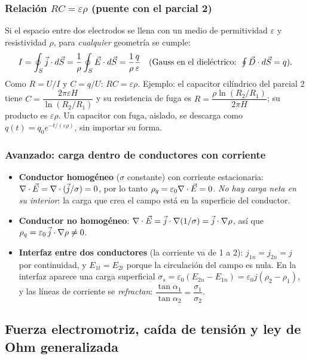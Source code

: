 \documentclass[11pt]{article}
\begin{document}
\subsubsection*{Relación $RC=\varepsilon\rho$ (puente con el parcial 2)}
Si el espacio entre dos electrodos se llena con un medio de permitividad $\varepsilon$ y resistividad $\rho$, para \emph{cualquier} geometría se cumple:
\[
I=\oint_S\vec{j}\cdot d\vec S=\frac1\rho\oint_S\vec{E}\cdot d\vec S=\frac{1}{\rho}\frac{q}{\varepsilon}\quad\text{(Gauss en el dieléctrico: }\textstyle\oint\vec{D}\cdot d\vec S=q).
\]
Como $R=U/I$ y $C=q/U$: $\boxed{RC=\varepsilon\rho}$. Ejemplo: el capacitor cilíndrico del parcial 2 tiene $C=\dfrac{2\pi\varepsilon H}{\ln(R_2/R_1)}$ y su resistencia de fuga es $R=\dfrac{\rho\ln(R_2/R_1)}{2\pi H}$; su producto es $\varepsilon\rho$. Un capacitor con fuga, aislado, se descarga como $q(t)=q_0e^{-t/(\varepsilon\rho)}$, sin importar su forma.

\subsubsection*{Avanzado: carga dentro de conductores con corriente}
\begin{itemize}
\item \textbf{Conductor homogéneo} ($\sigma$ constante) con corriente estacionaria: $\nabla\cdot\vec{E}=\nabla\cdot(\vec{j}/\sigma)=0$, por lo tanto $\rho_q=\varepsilon_0\nabla\cdot\vec{E}=0$. \emph{No hay carga neta en su interior}: la carga que crea el campo está en la superficie del conductor.
\item \textbf{Conductor no homogéneo}: $\nabla\cdot\vec{E}=\vec{j}\cdot\nabla(1/\sigma)=\vec{j}\cdot\nabla\rho$, así que $\rho_q=\varepsilon_0\,\vec{j}\cdot\nabla\rho\neq0$.
\item \textbf{Interfaz entre dos conductores} (la corriente va de 1 a 2): $j_{1n}=j_{2n}=j$ por continuidad, y $E_{1t}=E_{2t}$ porque la circulación del campo es nula. En la interfaz aparece una carga superficial $\sigma_s=\varepsilon_0(E_{2n}-E_{1n})=\varepsilon_0 j(\rho_2-\rho_1)$, y las líneas de corriente se \emph{refractan}: $\dfrac{\tan\alpha_1}{\tan\alpha_2}=\dfrac{\sigma_1}{\sigma_2}$.
\end{itemize}

\subsection{Fuerza electromotriz, caída de tensión y ley de Ohm generalizada}
\end{document}
